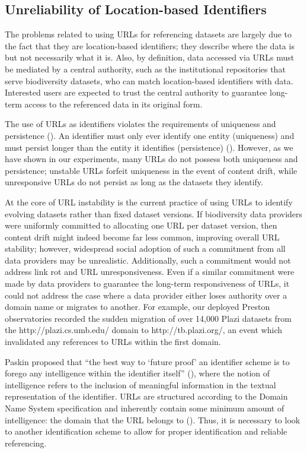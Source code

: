 \documentclass[10pt,letterpaper]{article}
\begin{document}
\subsection*{Unreliability of Location-based Identifiers}

The problems related to using URLs for referencing datasets are largely due to the fact that they are location-based identifiers; they describe where the data is but not necessarily what it is. Also, by definition, data accessed via URLs must be mediated by a central authority, such as the institutional repositories that serve biodiversity datasets, who can match location-based identifiers with data. Interested users are expected to trust the central authority to guarantee long-term access to the referenced data in its original form.

The use of URLs as identifiers violates the requirements of uniqueness and persistence (\cite{Paskin_1999}). An identifier must only ever identify one entity (uniqueness) and must persist longer than the entity it identifies (persistence) (\cite{Paskin_1999}). However, as we have shown in our experiments, many URLs do not possess both uniqueness and persistence; unstable URLs forfeit uniqueness in the event of content drift, while unresponsive URLs do not persist as long as the datasets they identify.

At the core of URL instability is the current practice of using URLs to identify evolving datasets rather than fixed dataset versions. If biodiversity data providers were uniformly committed to allocating one URL per dataset version, then content drift might indeed become far less common, improving overall URL stability; however, widespread social adoption of such a commitment from all data providers may be unrealistic. Additionally, such a commitment would not address link rot and URL unresponsiveness. Even if a similar commitment were made by data providers to guarantee the long-term responsiveness of URLs, it could not address the case where a data provider either loses authority over a domain name or migrates to another. For example, our deployed Preston observatories recorded the sudden migration of over 14,000 Plazi datasets from the http://plazi.cs.umb.edu/ domain to http://tb.plazi.org/, an event which invalidated any references to URLs within the first domain.

Paskin proposed that “the best way to ‘future proof’ an identifier scheme is to forego any intelligence within the identifier itself” (\cite{Paskin_1999}), where the notion of intelligence refers to the inclusion of meaningful information in the textual representation of the identifier. URLs are structured according to the Domain Name System specification and inherently contain some minimum amount of intelligence: the domain that the URL belongs to (\cite{rfc1034}). Thus, it is necessary to look to another identification scheme to allow for proper identification and reliable referencing.
\end{document}
